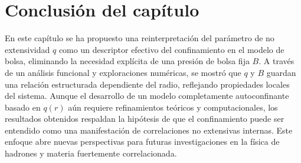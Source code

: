 \section*{Conclusi\'on del cap\'itulo}

En este cap\'itulo se ha propuesto una reinterpretaci\'on del par\'ametro de no extensividad \( q \) como un descriptor efectivo del confinamiento en el modelo de bolsa, eliminando la necesidad expl\'icita de una presi\'on de bolsa fija \( B \). A trav\'es de un an\'alisis funcional y exploraciones num\'ericas, se mostr\'o que \( q \) y \( B \) guardan una relaci\'on estructurada dependiente del radio, reflejando propiedades locales del sistema. Aunque el desarrollo de un modelo completamente autoconfinante basado en \( q(r) \) a\'un requiere refinamientos te\'oricos y computacionales, los resultados obtenidos respaldan la hip\'otesis de que el confinamiento puede ser entendido como una manifestaci\'on de correlaciones no extensivas internas. Este enfoque abre nuevas perspectivas para futuras investigaciones en la f\'isica de hadrones y materia fuertemente correlacionada.
